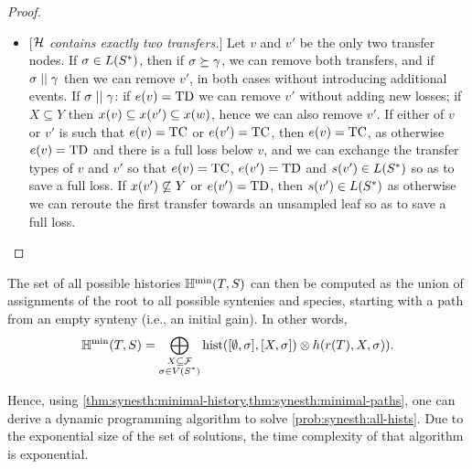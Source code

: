 \begin{proof}
\begin{itemize}
        \item {[\emph{\(\mathcal{H}\) contains exactly two transfers.}]}
            Let \(v\) and \(v'\) be the only two transfer nodes.
            If \(\sigma \in L(S^*)\), then if \(\sigma \succeq \gamma\), we can remove both transfers, and if \(\sigma \mathrel{||} \gamma\) then we can remove \(v'\), in both cases without introducing additional events.
            If \(\sigma \mathrel{||} \gamma\):
                if \(e(v) = \mathrm{TD}\) we can remove \(v'\) without adding new losses;
                if \(X \subseteq Y\) then \(x(v) \subseteq x(v') \subseteq x(w)\), hence we can also remove \(v'\).
            If either of \(v\) or \(v'\) is such that \(e(v) = \mathrm{TC}\) or \(e(v') = \mathrm{TC}\), then \(e(v) = \mathrm{TC}\), as otherwise \(e(v) = \mathrm{TD}\) and there is a full loss below \(v\), and we can exchange the transfer types of \(v\) and \(v'\) so that \(e(v) = \mathrm{TC}\), \(e(v') = \mathrm{TD}\) and \(s(v') \in L(S^*)\) so as to save a full loss.
            If \(x(v') \not\subseteq Y\) or \(e(v') = \mathrm{TD}\), then \(s(v') \in L(S^*)\) as otherwise we can reroute the first transfer towards an unsampled leaf so as to save a full loss. \qedhere
    \end{itemize}
\end{proof}

The set of all possible histories \(\mathbb{H}^{\mathrm{min}}(T, S)\) can then be computed as the union of assignments of the root to all possible syntenies and species, starting with a path from an empty synteny (i.e., an initial gain).
In other words, \[\mathbb{H}^{\mathrm{min}}(T, S) = \bigoplus_{\substack{X \subseteq \mathcal{F}\\\sigma \in V(S^*)}}{\mathrm{hist}([\emptyset, \sigma], [X, \sigma]) \otimes h(r(T), X, \sigma))}.\]

Hence, using \cref{thm:synesth:minimal-history,thm:synesth:minimal-paths}, one can derive a dynamic programming algorithm to solve \cref{prob:synesth:all-hists}.
Due to the exponential size of the set of solutions, the time complexity of that algorithm is exponential.

